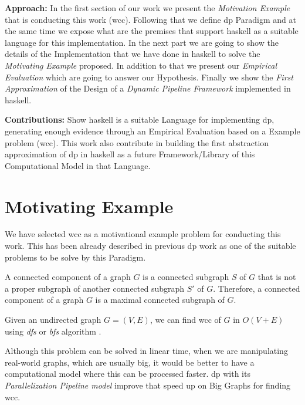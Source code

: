\documentclass[preprint]{elsarticle}
\begin{document}
\textbf{Approach:} In the first section of our work we present the \emph{Motivation Example} that is conducting this work (\acrshort{wcc}). Following that we define \acrshort{dp} Paradigm and at the same time we expose what are the premises that support \acrshort{haskell} as a suitable language for this implementation.
In the next part we are going to show the details of the Implementation that we have done in \acrshort{haskell} to solve the \emph{Motivating Example} proposed. In addition to that we present our \emph{Empirical Evaluation} which are going to answer our Hypothesis.
Finally we show the \emph{First Approximation} of the Design of a \emph{Dynamic Pipeline Framework} implemented in \acrshort{haskell}.

\textbf{Contributions:} Show \acrshort{haskell} is a suitable Language for implementing \acrshort{dp}, generating enough evidence through an Empirical Evaluation based on a Example problem (\acrshort{wcc}). This work also contribute in building the first abstraction approximation of \acrshort{dp} in \acrshort{haskell} as a future Framework/Library of this Computational Model in that Language. 


\section{Motivating Example}
We have selected \acrfull{wcc} as a motivational example problem for conducting this work. This has been already described in previous \acrshort{dp} work \citep{dpdef} as one of the suitable problems to be solve by this Paradigm.

\begin{defin}
A connected component of a graph $G$ is a connected subgraph $S$ of $G$ that is not a proper subgraph
of another connected subgraph $S'$ of $G$. Therefore, a connected component of a graph $G$ is a maximal
connected subgraph of $G$.
\end{defin}

Given an undirected graph $G = (V, E)$, we can find \acrshort{wcc} of $G$ in $O(V + E)$ using \textit{\acrfull{dfs}} or \textit{\acrfull{bfs}} algorithm \citep{CormenLeisersonEtAl09}. 

Although this problem can be solved in linear time, when we are manipulating real-world graphs, which are usually big, it would be better to have a computational model where this can be processed faster. \acrshort{dp} with its \textit{Parallelization Pipeline model} improve that speed up on Big Graphs for finding \acrshort{wcc}.
\end{document}
